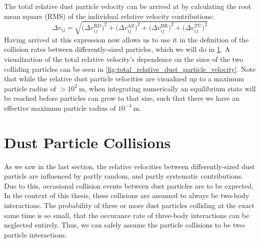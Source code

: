         The total relative dust particle velocity can be arrived at by calculating the 
        root mean square (RMS) of the individual relative velocity contributions:
        \begin{equation}
            \Delta v_{ij}
                = \sqrt{
                    \big(\Delta v^\text{RD}_{ij}\big)^2
                    + \big(\Delta v^\text{AZ}_{ij}\big)^2
                    + \big(\Delta v^\text{BR}_{ij}\big)^2
                    + \big(\Delta v^\text{TU}_{ij}\big)^2
                }
        \end{equation}
        Having arrived at this expression now allows us to use it in the definition of the 
        collision rates between differently-sized particles, which we will do in 
        \cref{sec:dust_particle_collisions}. 
        A visualization of the total relative velocity's dependence on the sizes of the
        two colliding particles can be seen in \cref{fig:total_relative_dust_particle_velocity}. 
        Note that while the relative dust particle velocities are visualized up to a maximum 
        particle radius of $>10^2\ \text{m}$, when integrating numerically an equilibrium state 
        will be reached before particles can grow to that size, such that there we have an 
        effective maximum particle radius of $10^{-4}\ \text{m}$.

        
        


\clearpage\section{Dust Particle Collisions}
\label{sec:dust_particle_collisions}

    As we saw in the last section, the relative velocities between differently-sized dust particls 
    are influenced by partly random, and partly systematic contributions. 
    Due to this, occasional collision events between dust particles are to be expected. \\ 

    In the context of this thesis, these collisions are assumed to always be two-body 
    interactions. The probability of three or more dust particles colliding at the exact same time
    is so small, that the occurance rate of three-body interactions can be neglected entirely.
    Thus, we can safely assume the particle collisions to be two-particle interactions.

